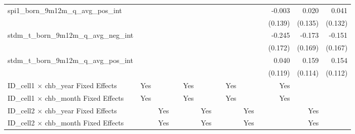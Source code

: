 \begin{tabular}{lrrrrrrrrrrrr}
spi1\_born\_9m12m\_q\_avg\_pos\_int         &              &              &              &              &              &              &              &              &              &       -0.003 &        0.020 &        0.041 \\ 
                                            &              &              &              &              &              &              &              &              &              &      (0.139) &      (0.135) &      (0.132) \\ 
stdm\_t\_born\_9m12m\_q\_avg\_neg\_int      &              &              &              &              &              &              &              &              &              &       -0.245 &       -0.173 &       -0.151 \\ 
                                            &              &              &              &              &              &              &              &              &              &      (0.172) &      (0.169) &      (0.167) \\ 
stdm\_t\_born\_9m12m\_q\_avg\_pos\_int      &              &              &              &              &              &              &              &              &              &        0.040 &        0.159 &        0.154 \\ 
                                            &              &              &              &              &              &              &              &              &              &      (0.119) &      (0.114) &      (0.112) \\ 
\midrule
ID\_cell1 $\times$ chb\_year Fixed Effects  &          Yes &              &              &          Yes &              &              &          Yes &              &              &          Yes &              &              \\ 
ID\_cell1 $\times$ chb\_month Fixed Effects &          Yes &              &              &          Yes &              &              &          Yes &              &              &          Yes &              &              \\ 
ID\_cell2 $\times$ chb\_year Fixed Effects  &              &          Yes &              &              &          Yes &              &              &          Yes &              &              &          Yes &              \\ 
ID\_cell2 $\times$ chb\_month Fixed Effects &              &          Yes &              &              &          Yes &              &              &          Yes &              &              &          Yes &              \\ 

\end{tabular}
